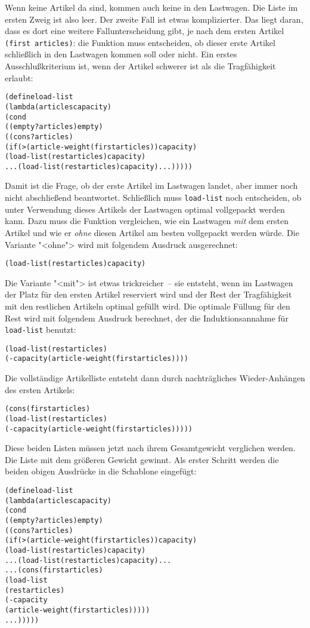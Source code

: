 %
Wenn keine Artikel da sind, kommen
auch keine in den Lastwagen.  Die Liste im ersten Zweig ist also leer.  Der
zweite Fall ist etwas komplizierter.
Das liegt daran, dass es dort
eine weitere Fallunterscheidung gibt, je nach dem ersten Artikel
\texttt{(first articles)}:
die Funktion muss entscheiden, ob dieser erste
Artikel schließlich in den Lastwagen kommen soll oder nicht.
Ein erstes Ausschlußkriterium ist, wenn der Artikel schwerer ist als die
Tragfähigkeit erlaubt:
%
\begin{alltt}
(define load-list
  (lambda (articles capacity)
    (cond
     ((empty? articles) empty)
     ((cons? articles)
        (if (> (article-weight (first articles)) capacity)
            (load-list (rest articles) capacity)
            ... (load-list (rest articles) capacity) ...)))))
\end{alltt}
%
Damit ist die Frage, ob der erste Artikel im Lastwagen landet, aber immer
noch nicht abschließend beantwortet.  Schließlich muss
\texttt{load-list} noch entscheiden, ob unter Verwendung dieses
Artikels der Lastwagen optimal vollgepackt werden
kann.  Dazu muss die Funktion vergleichen, wie ein Lastwagen \emph{mit}
dem ersten Artikel und wie er \emph{ohne} diesen Artikel am besten
vollgepackt werden würde.   Die Variante "<ohne"> wird mit folgendem
Ausdruck ausgerechnet:
%
\begin{alltt}
  (load-list (rest articles) capacity)
\end{alltt}
%
Die Variante "<mit"> ist etwas trickreicher~-- sie entsteht, wenn im
Lastwagen der Platz für den ersten Artikel reserviert wird und
der Rest der Tragfähigkeit mit den restlichen Artikeln optimal gefüllt wird.
Die optimale Füllung für den Rest wird mit folgendem Ausdruck
berechnet, der die Induktionsannahme für \texttt{load-list} benutzt:
%
\begin{alltt}
  (load-list (rest articles) 
                 (- capacity (article-weight (first articles))))
\end{alltt}
%
Die vollständige Artikelliste entsteht dann durch nachträgliches
Wieder-Anhängen des ersten Artikels:
%
\begin{alltt}
  (cons (first articles)
             (load-list (rest articles)
                            (- capacity (article-weight (first articles)))))
\end{alltt}
%
Diese beiden Listen müssen jetzt nach ihrem Gesamtgewicht verglichen
werden.  Die Liste mit dem größeren Gewicht gewinnt.  Als erster
Schritt werden die beiden obigen Ausdrücke in die Schablone eingefügt:
%
\begin{alltt}
(define load-list
  (lambda (articles capacity)
    (cond
     ((empty? articles) empty)
     ((cons? articles)
        (if (> (article-weight (first articles)) capacity)
            (load-list (rest articles) capacity)
            ... (load-list (rest articles) capacity) ...
            ... (cons (first articles)
                           (load-list
                             (rest articles)
                             (- capacity
                                (article-weight (first articles)))))
            ...)))))
\end{alltt}
